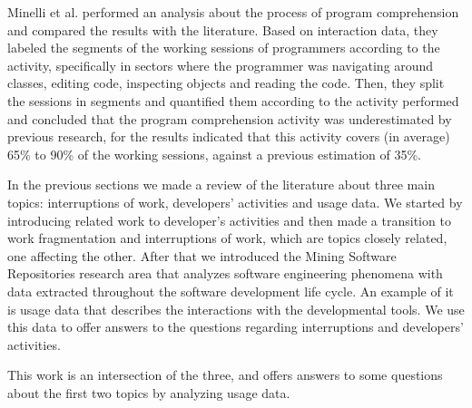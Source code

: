 Minelli et al. \cite{MMLK14} performed an analysis about the process of program comprehension and compared the results with the literature. Based on interaction data, they labeled the segments of the working sessions of programmers according to the activity, specifically in sectors where the programmer was navigating around classes, editing code, inspecting objects and reading the code. Then, they split the sessions in segments and quantified them according to the activity performed and concluded that the program comprehension activity was underestimated by previous research, for the results indicated that this activity covers (in average) 65\% to 90\% of the working sessions, against a previous estimation of 35\%.


\begin{changedforreviewerlong}
In the previous sections we made a review of the literature about three main topics: interruptions of work, developers' activities and usage data. We started by introducing related work to developer's activities and then made a transition to work fragmentation and interruptions of work, which are topics closely related, one affecting the other. After that we introduced the Mining Software Repositories research area that analyzes software engineering phenomena with data extracted throughout the software development life cycle. An example of it is usage data that describes the interactions with the developmental tools. We use this data to offer answers to the questions regarding interruptions and developers' activities.

This work is an intersection of the three, and offers answers to some questions about the first two topics by analyzing usage data. 
\end{changedforreviewerlong}